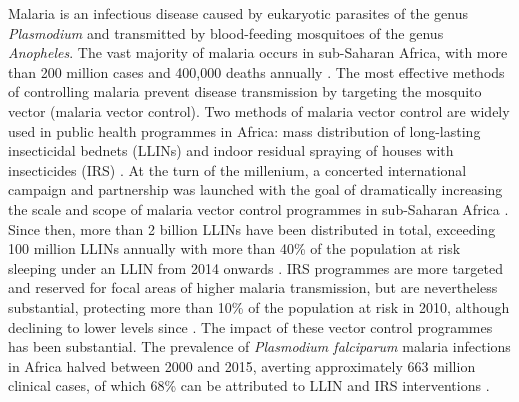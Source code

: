 \documentclass[a4paper,11pt,abstracton,hidelinks]{scrartcl}
\begin{document}
Malaria is an infectious disease caused by eukaryotic parasites of the genus \textit{Plasmodium} and transmitted by blood-feeding mosquitoes of the genus \textit{Anopheles}.
%
The vast majority of malaria occurs in sub-Saharan Africa, with more than 200 million cases and 400,000 deaths annually \citep{WHO2019WMR}.
%
The most effective methods of controlling malaria prevent disease transmission by targeting the mosquito vector (malaria vector control).
%
Two methods of malaria vector control are widely used in public health programmes in Africa: mass distribution of long-lasting insecticidal bednets (LLINs)
\citep{Carnevale2019,Okumu2020} and indoor residual spraying of houses with insecticides (IRS) \citep{WHO2006IRS,Pluess2010,Choi2019}.
%
At the turn of the millenium, a concerted international campaign and partnership was launched with the goal of dramatically increasing the scale and scope of malaria vector control programmes in sub-Saharan Africa \citep{Nabarro1998}.
%
Since then, more than 2 billion LLINs have been distributed in total, exceeding 100 million LLINs annually \citep{AMP2020} with more than 40\% of the population at risk sleeping under an LLIN from 2014 onwards \citep{Bhatt2015,WHO2019WMR}.
%
IRS programmes are more targeted and reserved for focal areas of higher malaria transmission, but are nevertheless substantial, protecting more than 10\% of the population at risk in 2010, although declining to lower levels since \citep{Bhatt2015,WHO2019WMR,Tangena2020}. 
%
The impact of these vector control programmes has been substantial. 
%
The prevalence of \textit{Plasmodium falciparum} malaria infections in Africa halved between 2000 and 2015, averting approximately 663 million clinical cases, of which 68\% can be attributed to LLIN and IRS interventions \citep{Bhatt2015}.
\end{document}
